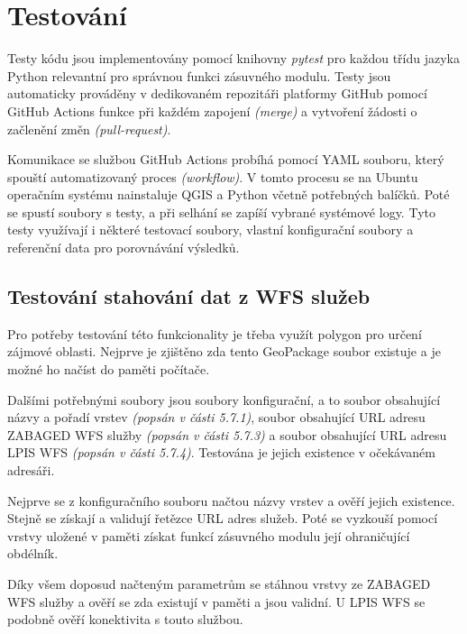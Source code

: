 \documentclass[a4paper,oneside,12pt]{book}
\begin{document}
\section{Testování} \label{testing}
\hspace{10mm} Testy kódu jsou implementovány pomocí knihovny \textit{pytest} pro každou třídu jazyka Python relevantní pro správnou funkci zásuvného modulu. Testy jsou automaticky prováděny v dedikovaném repozitáři platformy GitHub pomocí GitHub Actions funkce při každém zapojení \textit{(merge)} a vytvoření žádosti o začlenění změn  \textit{(pull-request)}.

\hspace{10mm} Komunikace se službou GitHub Actions probíhá pomocí YAML souboru, který spouští automatizovaný proces\textit{ (workflow)}. V tomto procesu se na Ubuntu operačním systému nainstaluje QGIS a Python včetně potřebných balíčků. Poté se spustí soubory s testy, a při selhání se zapíší vybrané systémové logy. Tyto testy využívají i některé testovací soubory, vlastní konfigurační soubory a referenční data pro porovnávání výsledků.

\subsection{Testování stahování dat z WFS služeb} \label{test_WFS}
\hspace{10mm} Pro potřeby testování této funkcionality je třeba využít polygon pro určení zájmové oblasti. Nejprve je zjištěno zda tento GeoPackage soubor existuje a je možné ho načíst do paměti počítače. 

\hspace{10mm} Dalšími potřebnými soubory jsou soubory konfigurační, a to soubor obsahující názvy
a pořadí vrstev \textit{(popsán v části 5.7.1)}, soubor obsahující URL adresu ZABAGED WFS služby \textit{(popsán v části 5.7.3)} a soubor obsahující URL adresu LPIS WFS \textit{(popsán v části 5.7.4)}. Testována je jejich existence v očekávaném adresáři.

\hspace{10mm} Nejprve se z konfiguračního souboru načtou názvy vrstev a ověří jejich existence.
Stejně se získají a validují řetězce URL adres služeb. Poté se vyzkouší pomocí vrstvy uložené v paměti získat funkcí zásuvného modulu její ohraničující obdélník.

\hspace{10mm} Díky všem doposud načteným parametrům se stáhnou vrstvy ze ZABAGED WFS služby a ověří se zda existují v paměti a jsou validní. U LPIS WFS se podobně ověří konektivita s touto službou.
\end{document}
